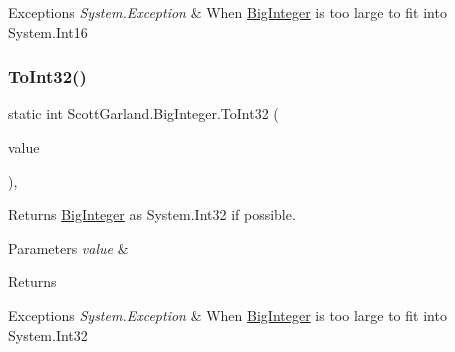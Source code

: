\begin{DoxyExceptions}{Exceptions}
{\em System.\+Exception} & When \hyperlink{class_scott_garland_1_1_big_integer}{Big\+Integer} is too large to fit into System.\+Int16\\
\hline
\end{DoxyExceptions}
\mbox{\label{class_scott_garland_1_1_big_integer_ae3db4ced22f3c869e6093fe0dc3f7b73}} 
\subsubsection{\texorpdfstring{To\+Int32()}{ToInt32()}}
{\footnotesize\ttfamily static int Scott\+Garland.\+Big\+Integer.\+To\+Int32 (\begin{DoxyParamCaption}\item[{\hyperlink{class_scott_garland_1_1_big_integer}{Big\+Integer}}]{value }\end{DoxyParamCaption})\hspace{0.3cm}{\ttfamily [inline]}, {\ttfamily [static]}}



Returns \hyperlink{class_scott_garland_1_1_big_integer}{Big\+Integer} as System.\+Int32 if possible. 


\begin{DoxyParams}{Parameters}
{\em value} & \\
\hline
\end{DoxyParams}
\begin{DoxyReturn}{Returns}

\end{DoxyReturn}

\begin{DoxyExceptions}{Exceptions}
{\em System.\+Exception} & When \hyperlink{class_scott_garland_1_1_big_integer}{Big\+Integer} is too large to fit into System.\+Int32\\
\hline
\end{DoxyExceptions}
\mbox{\label{class_scott_garland_1_1_big_integer_ae0fc996dd71a2fb206e03230c1534a6a}} 
